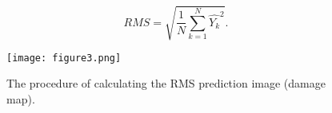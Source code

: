 \begin{sloppypar}
	\begin{equation}
		RMS = \sqrt{\frac{1}{N}\sum_{k=1}^{N}\hat{Y_k}^2}.	
		\label{RMS}
	\end{equation}
	\begin{figure}[!ht]
		\centering
		\texttt{[image: figure3.png]}
		\caption{The procedure of calculating the RMS prediction image (damage map).}
		\label{fig:Diagram_exp_predictions}
	\end{figure}
\end{sloppypar}
\newpage